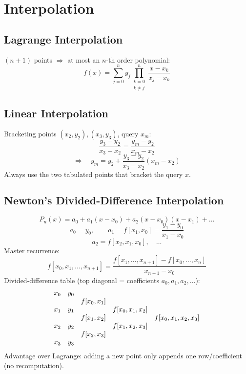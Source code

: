 \section{Interpolation}

\subsection{Lagrange Interpolation}
\begin{formulabox}
$(n+1)$ points $\Rightarrow$ at most an $n$-th order polynomial:
\[
f(x) = \sum_{j=0}^{n} y_j \prod_{\substack{k=0 \\ k\neq j}}^{n} \frac{x - x_k}{x_j - x_k}
\]
\end{formulabox}

\subsection{Linear Interpolation}
\begin{formulabox}
Bracketing points $(x_2,y_2),(x_3,y_3)$, query $x_m$:
\[
\frac{y_3 - y_2}{x_3 - x_2} = \frac{y_m - y_2}{x_m - x_2}
\]
\[
\Longrightarrow\quad y_m = y_2 + \frac{y_3-y_2}{x_3-x_2}(x_m - x_2)
\]
Always use the two tabulated points that bracket the query $x$.
\end{formulabox}

\subsection{Newton's Divided-Difference Interpolation}
\begin{formulabox}
\[
P_n(x) = a_0 + a_1(x-x_0) + a_2(x-x_0)(x-x_1) + \dots
\]
\[
a_0 = y_0, \qquad a_1 = f[x_1,x_0] = \frac{y_1-y_0}{x_1-x_0}
\]
\[
a_2 = f[x_2,x_1,x_0], \quad \dots
\]
Master recurrence:
\[
f[x_0,x_1,\dots,x_{n+1}] = \frac{f[x_1,\dots,x_{n+1}] - f[x_0,\dots,x_n]}{x_{n+1}-x_0}
\]
Divided-difference table (top diagonal = coefficients $a_0,a_1,a_2,\dots$):
\[
\begin{array}{c c c c c}
x_0 & y_0 & & & \\
 & & f[x_0,x_1] & & \\
x_1 & y_1 & & f[x_0,x_1,x_2] & \\
 & & f[x_1,x_2] & & f[x_0,x_1,x_2,x_3]\\
x_2 & y_2 & & f[x_1,x_2,x_3] & \\
 & & f[x_2,x_3] & & \\
x_3 & y_3 & & &
\end{array}
\]
Advantage over Lagrange: adding a new point only appends one row/coefficient (no recomputation).
\end{formulabox}

